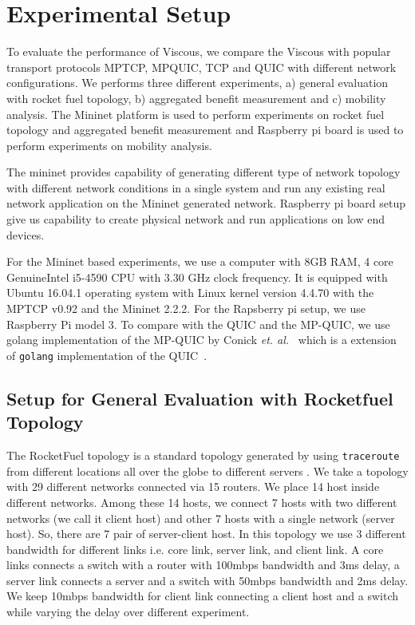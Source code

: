 \section{Experimental Setup}
\label{exp}

To evaluate the performance of Viscous, we compare the Viscous with popular transport protocols MPTCP, MPQUIC\cite{mpquic-measure}, TCP and QUIC with different network configurations. We performs three different experiments, a) general evaluation with rocket fuel topology, b) aggregated benefit measurement and c) mobility analysis. The Mininet platform is used to perform experiments on rocket fuel topology and aggregated benefit measurement and Raspberry pi board is used to perform experiments on mobility analysis. 

The mininet provides capability of generating different type of network topology with different network conditions in a single system and run any existing real network application on the Mininet generated network. Raspberry pi board setup give us capability to create physical network and run applications on low end devices.

For the Mininet based experiments, we use a computer with 8GB RAM, 4 core GenuineIntel i5-4590 CPU with 3.30 GHz clock frequency. It is equipped with Ubuntu 16.04.1 operating system with Linux kernel version 4.4.70 with the MPTCP v0.92 and the Mininet 2.2.2. For the Rapsberry pi setup, we use Raspberry Pi model 3.
To compare with the QUIC and the MP-QUIC, we use golang implementation of the MP-QUIC by Conick {\it et. al.}~\cite{mpquic-measure} which is a extension of \texttt{golang} implementation of the QUIC~\cite{quic-go}.

\subsection{Setup for General Evaluation with Rocketfuel Topology}
\label{expsetup-rocketfuel}
The RocketFuel topology is a standard topology generated by using {\tt traceroute} from different locations all over the globe to different servers \cite{Spring:2004:MIT:973492.973494}. We take a topology with 29 different networks connected via 15 routers. We place 14 host inside different networks. Among these 14 hosts, we connect 7 hosts with two different networks (we call it client host) and other 7 hosts with a single network (server host). So, there are 7 pair of server-client host. In this topology we use 3 different bandwidth for different links i.e. core link, server link, and client link. A core links connects a switch with a router with 100mbps bandwidth and 3ms delay, a server link connects a server and a switch with 50mbps bandwidth and 2ms delay. We keep 10mbps bandwidth for client link connecting a client host and a switch while varying the delay over different experiment.

